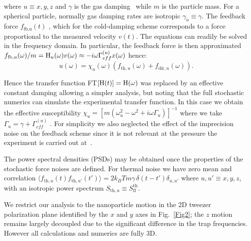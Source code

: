 \documentclass[twocolumn,english,notitlepage,superscriptaddress,nofootinbib]{revtex4-2}
\begin{document}
\noindent where $u\equiv x,y,z$ and $\gamma$ is the gas damping~\cite{Epstein1924on,Cavalleri2010gas} while $m$ is the particle mass.  For a spherical particle,  normally gas damping rates are isotropic $\gamma_u\equiv \gamma$. 
 The feedback force  $f_{\text{fb,u}}(t)$ , which for the cold-damping scheme corresponds to a force proportional to the measured velocity $v(t)$.  The  equations can readily be solved in the frequency domain.  In particular,  the  feedback force is then
 approximated $f_{\text{fb},u}(\omega)/m= {\text H}_u(\omega)v(\omega) \approx -i\omega \Gamma^{(u)}_{eff} x(\omega)$ hence: 
\begin{equation}\label{eq2}
u (\omega)=\chi_u(\omega) (f_{\text{th},u}(\omega) +f_{\text{dir},u}(\omega)).
\end{equation}

Hence the transfer function FT$[{\text H}(t)] ={\text H}(\omega)$ was replaced by an effective constant damping
allowing a simpler analysis,  but noting that  the full stochastic numerics can simulate the experimental transfer function.
In this case we obtain the  effective susceptibility $\chi_u=[m(\omega_u^2-\omega^2+i \omega \Gamma_u)]^{-1}$ where we take $\Gamma_u= \gamma+ \Gamma^{(u)}_{eff}$ .  For simplicity we also  neglected the effect of the imprecision noise on the feedback scheme since it is not relevant at the pressure the experiment is carried out at~\cite{Penny2021performance}.

The power spectral densities (PSDs) may be obtained once the properties of the stochastic force noises are defined.  For thermal noise we have zero mean and correlation $\langle f_{\text{th},u}(t) f_{\text{th}, u'}(t') \rangle=2k_B T m \gamma \,\delta(t-t')\delta_{u,u'}$ where $u, u'\equiv x,y,z$, with an isotropic power spectrum $S_{\text{th},u}\equiv S_{\text{ff}}^{\text{th}}$.

 We restrict our analysis to the nanoparticle motion in the 2D  tweezer polarization plane identified by the $x$ and $y$ axes in Fig.~\ref{Fig2}; the $z$  motion remains largely decoupled due to the significant difference in the trap frequencies.  However all calculations and numerics are fully 3D.
 
\end{document}
